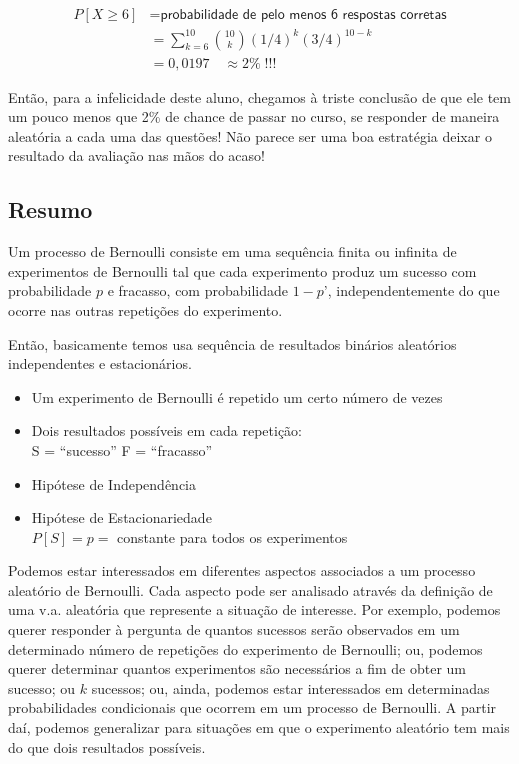 \documentclass[
]{book}
\theoremstyle{definition}
\theoremstyle{definition}
\theoremstyle{definition}
\theoremstyle{remark}
\begin{document}
\begin{align*}
P[X\geq 6] &= \textsf{probabilidade de pelo menos 6 respostas corretas}\\
           &= \sum_{k=6}^{10}{\binom{10}{k}}(1/4)^k\left(3/4\right)^{10-k}\\
         &= 0,0197 \quad \approx 2\% \;!!!
\end{align*}

Então, para a infelicidade deste aluno, chegamos à triste conclusão de que ele tem um pouco menos que 2\% de chance de passar no curso, se responder de maneira aleatória a cada uma das questões! Não parece ser uma boa estratégia deixar o resultado da avaliação nas mãos do acaso!

\hypertarget{resumo-2}{%
\subsection*{Resumo}\label{resumo-2}}

Um processo de Bernoulli consiste em uma sequência finita ou infinita de experimentos de Bernoulli tal que cada experimento produz um sucesso com probabilidade \(p\) e fracasso, com probabilidade \(1-p\)', independentemente do que ocorre nas outras repetições do experimento.

Então, basicamente temos usa sequência de resultados binários aleatórios independentes e estacionários.

\begin{itemize}
\item
  Um experimento de Bernoulli é repetido um certo número de vezes
\item
  Dois resultados possíveis em cada repetição:\\
  S = ``sucesso'' F = ``fracasso''
\item
  Hipótese de Independência
\item
  Hipótese de Estacionariedade\\
  \(P[S]= p =\) constante para todos os experimentos
\end{itemize}

Podemos estar interessados em diferentes aspectos associados a um processo aleatório de Bernoulli. Cada aspecto pode ser analisado através da definição de uma v.a. aleatória que represente a situação de interesse. Por exemplo, podemos querer responder à pergunta de quantos sucessos serão observados em um determinado número de repetições do experimento de Bernoulli; ou, podemos querer determinar quantos experimentos são necessários a fim de obter um sucesso; ou \(k\) sucessos; ou, ainda, podemos estar interessados em determinadas probabilidades condicionais que ocorrem em um processo de Bernoulli. A partir daí, podemos generalizar para situações em que o experimento aleatório tem mais do que dois resultados possíveis.
\end{document}
